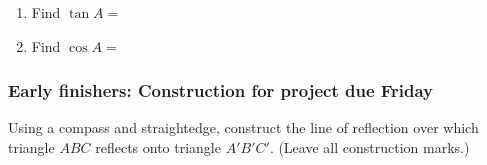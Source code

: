 \documentclass[12pt, twoside]{article}
\begin{document}
\begin{enumerate}
\begin{multicols}{2}
         \begin{enumerate}
         \item Find $\tan A =$ \vspace{0.75cm}
         \item Find $\cos A =$ \vspace{0.75cm}

       \end{enumerate}
   \end{multicols}


  \newpage
\subsubsection*{Early finishers: Construction for project due Friday}

  Using a compass and straightedge, construct the line of reflection over which triangle $ABC$ reflects onto triangle $A'B'C'$. (Leave all construction marks.) \vspace{4cm}
      \begin{center}
    \end{center}

\end{enumerate}
\end{document}
